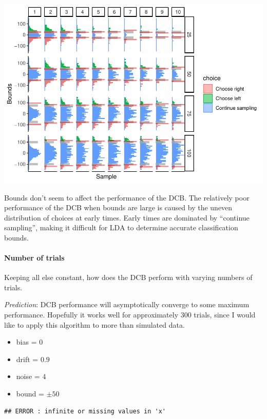 \documentclass[
]{book}
\providecommand{\tightlist}{%
  \setlength{\itemsep}{0pt}\setlength{\parskip}{0pt}}
\begin{document}
\includegraphics{LateNightBayes_files/figure-latex/unnamed-chunk-9-1.pdf}

Bounds don't seem to affect the performance of the DCB. The relatively poor performance of the DCB when bounds are large is caused by the uneven distribution of choices at early times. Early times are dominated by ``continue sampling'', making it difficult for LDA to determine accurate classification bounds.

\hypertarget{number-of-trials}{%
\paragraph*{Number of trials}\label{number-of-trials}}

Keeping all else constant, how does the DCB perform with varying numbers of trials.

\emph{Prediction}: DCB performance will asymptotically converge to some maximum performance. Hopefully it works well for approximately 300 trials, since I would like to apply this algorithm to more than simulated data.

\begin{itemize}
\tightlist
\item
  bias = \(0\)
\item
  drift = \(0.9\)
\item
  noise = \(4\)
\item
  bound = \(\pm 50\)
\end{itemize}

\begin{verbatim}
## ERROR : infinite or missing values in 'x'
\end{verbatim}
\end{document}

